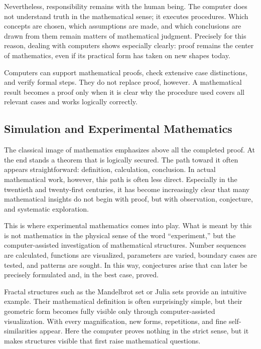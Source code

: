 Nevertheless, responsibility remains with the human being.
The computer does not understand truth in the mathematical sense;
it executes procedures.
Which concepts are chosen,
which assumptions are made,
and which conclusions are drawn from them
remain matters of mathematical judgment.
Precisely for this reason, dealing with computers shows especially clearly:
proof remains the center of mathematics,
even if its practical form has taken on new shapes today.

\begin{DidacticBox}
	\label{box:computer-proof}
	Computers can support mathematical proofs,
	check extensive case distinctions,
	and verify formal steps.
	They do not replace proof, however.
	A mathematical result becomes a proof only when it is clear
	why the procedure used covers all relevant cases
	and works logically correctly.
\end{DidacticBox}


\subsection{Simulation and Experimental Mathematics}

The classical image of mathematics emphasizes above all the completed proof.
At the end stands a theorem that is logically secured.
The path toward it often appears straightforward:
definition, calculation, conclusion.
In actual mathematical work, however,
this path is often less direct.
Especially in the twentieth and twenty-first centuries,
it has become increasingly clear
that many mathematical insights do not begin with proof,
but with observation, conjecture, and systematic exploration.

This is where experimental mathematics comes into play.
What is meant by this is not mathematics
in the physical sense of the word ``experiment,''
but the computer-assisted investigation of mathematical structures.
Number sequences are calculated,
functions are visualized,
parameters are varied,
boundary cases are tested,
and patterns are sought.
In this way, conjectures arise
that can later be precisely formulated
and, in the best case, proved.

Fractal structures such as the Mandelbrot set or Julia sets provide an intuitive example.
Their mathematical definition is often surprisingly simple,
but their geometric form becomes fully visible
only through computer-assisted visualization.
With every magnification,
new forms, repetitions, and fine self-similarities appear.
Here the computer proves nothing in the strict sense,
but it makes structures visible
that first raise mathematical questions.

